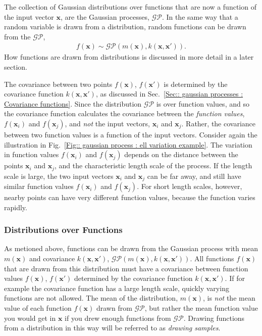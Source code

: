 \documentclass[twoside,english]{uiofysmaster}
\begin{document}
The collection of Gaussian distributions over functions that are now a function of the input vector $\textbf{x}$, are the Gaussian processes, $\mathcal{GP}$. In the same way that a random variable is drawn from a distribution, random functions can be drawn from the $\mathcal{GP}$,
\begin{align}
f(\textbf{x}) \sim \mathcal{GP}(m(\textbf{x}), k(\textbf{x}, \textbf{x}')).
\end{align}
How functions are drawn from distributions is discussed in more detail in a later section.

The covariance between two points $f(\textbf{x})$, $f(\textbf{x}')$ is determined by the covariance function $k(\textbf{x}, \textbf{x}')$, as discussed in Sec.~\ref{Sec:: gaussian processes : Covariance functions}. Since the distribution $\mathcal{GP}$ is over function values, and so the covariance function calculates the covariance between the \textit{function values}, $f(\textbf{x}_i)$ and $f(\textbf{x}_j)$, and \textit{not} the input vectors, $\textbf{x}_i$ and $\textbf{x}_j$. Rather, the covariance between two function values is a function of the input vectors. Consider again the illustration in Fig.~\ref{Fig:: gaussian process : ell variation example}. The variation in function values $f(\textbf{x}_i)$ and $f(\textbf{x}_j)$ depends on the distance between the points $\textbf{x}_i$ and $\textbf{x}_j$, and the characteristic length scale of the process. If the length scale is large, the two input vectors $\textbf{x}_i$ and $\textbf{x}_j$ can be far away, and still have similar function values $f(\textbf{x}_i)$ and $f(\textbf{x}_j)$. For short length scales, however, nearby points can have very different function values, because the function varies rapidly.

\subsubsection{Distributions over Functions}

As metioned above, functions can be drawn from the Gaussian process with mean $m(\textbf{x})$ and covariance $k(\textbf{x}, \textbf{x}')$, $\mathcal{GP}(m(\textbf{x}), k(\textbf{x}, \textbf{x}'))$. All functions $f(\textbf{x})$ that are drawn from this distribution must have a covariance between function values $f(\textbf{x})$, $f(\textbf{x}')$ determined by the covariance function $k(\textbf{x}, \textbf{x}')$. If for example the covariance function has a large length scale, quickly varying functions are not allowed. The mean of the distribution, $m(\textbf{x})$, is \textit{not} the mean value of each function $f(\textbf{x})$ drawn from $\mathcal{GP}$, but rather the mean function value you would get in $\textbf{x}$ if you drew enough functions from $\mathcal{GP}$. Drawing functions from a distribution in this way will be referred to as \textit{drawing samples}.
\end{document}
